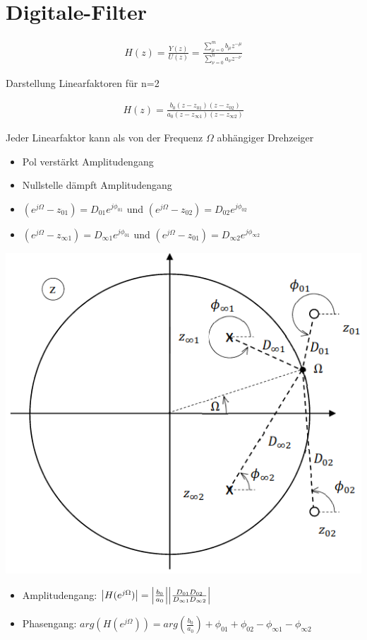 \documentclass[10pt,a4paper]{article}
\begin{document}
\section{Digitale-Filter}
  \begin{mdframed}[style=exercise]
    \begin{align}
        H(z)=\frac{Y(z)}{U(z)}= \frac{\sum_{\mu=0}^{m} b_\mu z^{-\mu}}{\sum_{\nu=0}^{n} a_\nu z^{-\nu}}
    \end{align}
  \end{mdframed}
Darstellung Linearfaktoren für n=2
  \begin{mdframed}[style=exercise]
    \begin{align}
        H(z)=\frac{b_0(z-z_{01})(z-z_{02})}{a_0(z-z_{\infty 1})(z-z_{\infty 2})}
    \end{align}
  \end{mdframed}
Jeder Linearfaktor kann als von der Frequenz $\Omega$ abhängiger Drehzeiger
\begin{itemize}
    \item Pol verstärkt Amplitudengang
    \item Nullstelle dämpft Amplitudengang
\end{itemize}
\begin{itemize}
    \item $(e^{j\Omega}-z_{01}) = D_{01}e^{j\phi_{01}}$ und $(e^{j\Omega}-z_{02}) = D_{02}e^{j\phi_{02}}$
    \item $(e^{j\Omega}-z_{\infty 1}) = D_{\infty 1}e^{j\phi_{01}}$ und $(e^{j\Omega}-z_{01}) = D_{\infty 2}e^{j\phi_{\infty 2}}$
\end{itemize}
  \begin{center}
      \includegraphics[width=.35\textwidth]{./img/ehk.png}
  \end{center}
\begin{itemize}
    \item Amplitudengang: $\abs{H(e^{j\Omega})}=\abs{\frac{b_0}{a_0}} \abs{ \frac{D_{01}D_{02}}{D_{\infty 1}D_{\infty 2}}}$
    \item Phasengang: $arg({H(e^{j\Omega})})=arg(\frac{b_0}{a_0}) +\phi_{01} +\phi_{02}-\phi_{\infty 1}-\phi_{\infty 2}$
\end{itemize}
\end{document}
